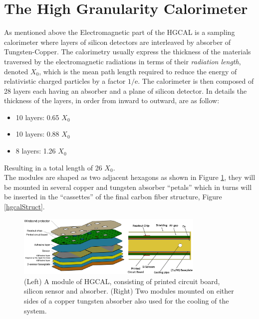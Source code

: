 \section{The High Granularity Calorimeter}
As mentioned above the Electromagnetic part of the HGCAL is a sampling calorimeter where layers of silicon detectors are interleaved by absorber of Tungsten-Copper.
The calorimetry usually express the thickness of the materials traversed by the electromagnetic radiations in terms of their \textit{radiation length}, denoted $X_0$, which is the mean path length required to reduce the energy of relativistic charged particles by a factor $1/\mathrm {e}$. The calorimeter is then composed of 28 layers each having an absorber and a plane of silicon detector. In details the thickness of the layers, in order from inward to outward, are as follow:
\begin{itemize}
\item 10 layers: 0.65 $X_0$
\item 10 layers: 0.88 $X_0$
\item 8 layers: 1.26 $X_0$
\end{itemize}
Resulting in a total length of 26 $X_0$.\\
The modules are shaped as two adjacent hexagons as shown in Figure \ref{hgcalMod}, they will be mounted in several copper and tungsten absorber ``petals'' which in turns will be inserted in the ``cassettes'' of the final carbon fiber structure, Figure \ref{hgcalStruct}.

\begin{figure}
\centerline{\includegraphics[width=0.8\textwidth]{intro/hgcalMod.png}}
\caption{(Left) A module of HGCAL, consisting of printed circuit board, silicon sensor and absorber. (Right) Two modules mounted on either sides of a copper tungsten absorber also used for the cooling of the system.}
\label{hgcalMod}
\end{figure}

